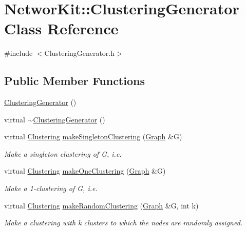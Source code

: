 \hypertarget{class_networ_kit_1_1_clustering_generator}{\section{Networ\-Kit\-:\-:Clustering\-Generator Class Reference}
\label{class_networ_kit_1_1_clustering_generator}
}


{\ttfamily \#include $<$Clustering\-Generator.\-h$>$}

\subsection*{Public Member Functions}
\begin{DoxyCompactItemize}
\item 
\hyperlink{class_networ_kit_1_1_clustering_generator_a9f953e4296caa047ca8810b1938264b8}{Clustering\-Generator} ()
\item 
virtual \hyperlink{class_networ_kit_1_1_clustering_generator_ad63aa03c038650c38d6a1bf767c734ff}{$\sim$\-Clustering\-Generator} ()
\item 
virtual \hyperlink{class_networ_kit_1_1_clustering}{Clustering} \hyperlink{class_networ_kit_1_1_clustering_generator_a0a9dc09f93d77c77562792b3537cf6c1}{make\-Singleton\-Clustering} (\hyperlink{class_networ_kit_1_1_graph}{Graph} \&G)
\begin{DoxyCompactList}\small\item\em Make a singleton clustering of G, i.\-e. \end{DoxyCompactList}\item 
virtual \hyperlink{class_networ_kit_1_1_clustering}{Clustering} \hyperlink{class_networ_kit_1_1_clustering_generator_ab1fb839d72c6ca2fcf0b7c2896fcd6e3}{make\-One\-Clustering} (\hyperlink{class_networ_kit_1_1_graph}{Graph} \&G)
\begin{DoxyCompactList}\small\item\em Make a 1-\/clustering of G, i.\-e. \end{DoxyCompactList}\item 
virtual \hyperlink{class_networ_kit_1_1_clustering}{Clustering} \hyperlink{class_networ_kit_1_1_clustering_generator_a2a2d4a14c14fb34fd9a66a1047c52c5d}{make\-Random\-Clustering} (\hyperlink{class_networ_kit_1_1_graph}{Graph} \&G, int k)
\begin{DoxyCompactList}\small\item\em Make a clustering with k clusters to which the nodes are randomly assigned. \end{DoxyCompactList}\end{DoxyCompactItemize}


